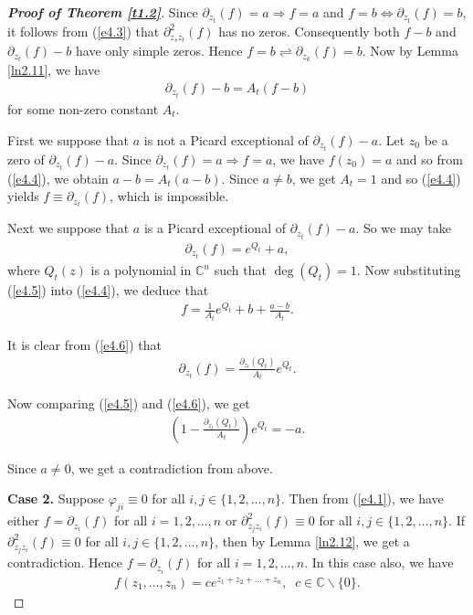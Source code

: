 \documentclass[11pt, reqno]{amsart}
\newtheorem*{cor A}{Corollary A}
\newtheorem*{cor B}{Corollary B}
\numberwithin{equation}{section}
\begin{document}
\begin{proof}[{\bf Proof of Theorem \ref{t1.2}}]
Since $\partial_{z_t}(f)=a\Rightarrow f=a$ and $f=b\Leftrightarrow \partial_{z_t}(f)=b$, it follows from (\ref{e4.3}) that $\partial_{z_sz_t}^2(f)$ has no zeros. Consequently both $f-b$ and $\partial_{z_t}(f)-b$ have only simple zeros. Hence $f=b\rightleftharpoons \partial_{z_k}(f)=b$. Now by Lemma \ref{ln2.11}, we have
\begin{align}\label{e4.4}
\partial_{z_t}(f)-b=A_t(f-b)
\end{align}
for some non-zero constant $A_t$.

\smallskip
First we suppose that $a$ is not a Picard exceptional of $\partial_{z_t}(f)-a$. Let $z_0$ be a zero of $\partial_{z_t}(f)-a$. Since $\partial_{z_t}(f)=a\Rightarrow f=a$, we have $f(z_0)=a$ and so from (\ref{e4.4}), we obtain $a-b=A_t(a-b)$. Since $a\neq b$, we get $A_t=1$ and so (\ref{e4.4}) yields $f\equiv \partial_{z_t}(f)$, which is impossible.
 
\smallskip
Next we suppose that $a$ is a Picard exceptional of $\partial_{z_t}(f)-a$. So we may take 
\begin{align}\label{e4.5}
\partial_{z_t}(f)=e^{Q_t}+a,
\end{align} 
where $Q_t(z)$ is a polynomial in $\mathbb{C}^n$ such that $\deg(Q_t)=1$. Now substituting (\ref{e4.5}) into (\ref{e4.4}), we deduce that
\begin{align}\label{e4.6}
f=\frac{1}{A_t}e^{Q_t}+b+\frac{a-b}{A_t}.
\end{align}

It is clear from (\ref{e4.6}) that 
\begin{align}\label{e4.7}
\partial_{z_t}(f)=\frac{\partial_{z_t}(Q_t)}{A_t}e^{Q_t}.
\end{align}

Now comparing (\ref{e4.5}) and (\ref{e4.6}), we get
\begin{align*}
\left(1-\frac{\partial_{z_t}(Q_t)}{A_t}\right)e^{Q_t}=-a.
\end{align*}

Since $a\neq 0$, we get a contradiction from above.

\smallskip
{\bf Case 2.} Suppose $\varphi_{ji}\equiv 0$ for all $i,j\in\{1,2,\ldots,n\}$. Then from (\ref{e4.1}), we have either $f=\partial_{z_i}(f)$ for all $i=1,2,\ldots,n$ or $\partial^2_{z_jz_i}(f)\equiv 0$ for all $i,j\in\{1,2,\ldots,n\}$. If $\partial^2_{z_jz_i}(f)\equiv 0$ for all $i,j\in\{1,2,\ldots,n\}$, then by Lemma \ref{ln2.12}, we get a contradiction. Hence $f=\partial_{z_i}(f)$ for all $i=1,2,\ldots,n$. In this case also, we have
\begin{align*}
f(z_1,\ldots,z_n)=ce^{z_1+z_2+\ldots+z_n}, \;\;c\in\mathbb{C}\backslash \{0\}.
\end{align*}

\end{proof}
\end{document}

